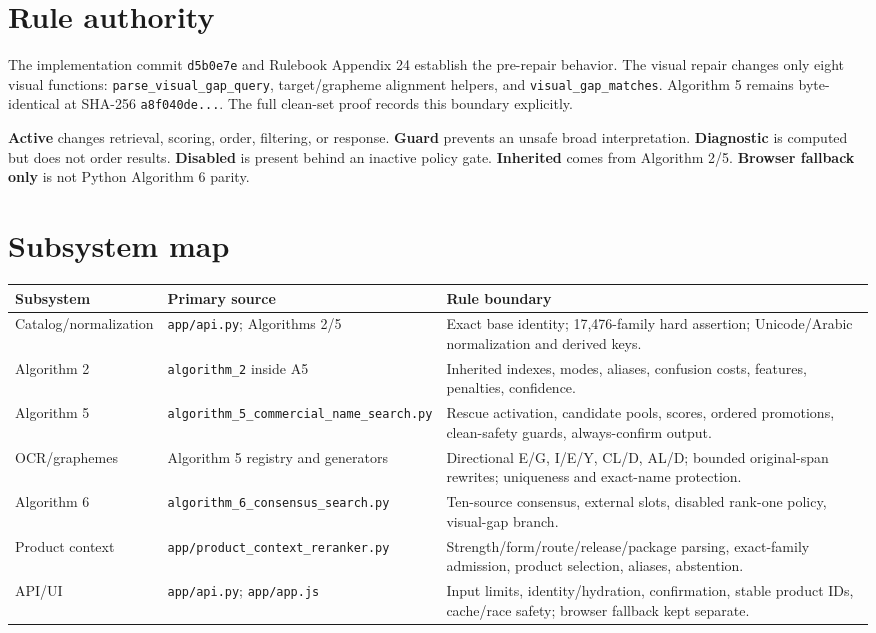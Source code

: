 \documentclass[10pt,oneside]{book}
\begin{document}
\section{Rule authority}

The implementation commit \texttt{d5b0e7e} and Rulebook Appendix 24 establish
the pre-repair behavior. The visual repair changes only eight visual functions:
\texttt{parse\_visual\_gap\_query}, target/grapheme alignment helpers, and
\texttt{visual\_gap\_matches}. Algorithm 5 remains byte-identical at SHA-256
\texttt{a8f040de...}. The full clean-set proof records this boundary explicitly.

\begin{methodbox}[title=Rule status vocabulary]
\textbf{Active} changes retrieval, scoring, order, filtering, or response.
\textbf{Guard} prevents an unsafe broad interpretation. \textbf{Diagnostic}
is computed but does not order results. \textbf{Disabled} is present behind an
inactive policy gate. \textbf{Inherited} comes from Algorithm 2/5.
\textbf{Browser fallback only} is not Python Algorithm 6 parity.
\end{methodbox}

\section{Subsystem map}

\begin{longtable}{@{}p{1.25in}p{2.0in}p{3.55in}@{}}
\toprule
Subsystem & Primary source & Rule boundary \\
\midrule
Catalog/normalization & \texttt{app/api.py}; Algorithms 2/5 & Exact base identity; 17,476-family hard assertion; Unicode/Arabic normalization and derived keys. \\
Algorithm 2 & \texttt{algorithm\_2} inside A5 & Inherited indexes, modes, aliases, confusion costs, features, penalties, confidence. \\
Algorithm 5 & \texttt{algorithm\_5\_commercial\_name\_search.py} & Rescue activation, candidate pools, scores, ordered promotions, clean-safety guards, always-confirm output. \\
OCR/graphemes & Algorithm 5 registry and generators & Directional E/G, I/E/Y, CL/D, AL/D; bounded original-span rewrites; uniqueness and exact-name protection. \\
Algorithm 6 & \texttt{algorithm\_6\_consensus\_search.py} & Ten-source consensus, external slots, disabled rank-one policy, visual-gap branch. \\
Product context & \texttt{app/product\_context\_reranker.py} & Strength/form/route/release/package parsing, exact-family admission, product selection, aliases, abstention. \\
API/UI & \texttt{app/api.py}; \texttt{app/app.js} & Input limits, identity/hydration, confirmation, stable product IDs, cache/race safety; browser fallback kept separate. \\
\bottomrule
\end{longtable}
\end{document}
